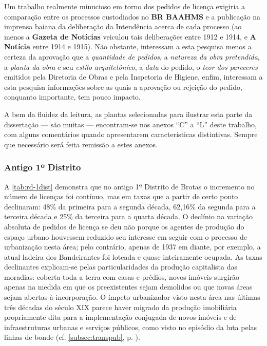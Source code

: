 Um trabalho realmente minucioso em torno dos pedidos de licença exigiria a comparação entre os processos custodiados no \textbf{BR BAAHMS} e a publicação na imprensa baiana da deliberação da Intendência acerca de cada processo (ao menos a \textbf{Gazeta de Notícias} veiculou tais deliberações entre 1912 e 1914, e \textbf{A Notícia} entre 1914 e 1915). Não obstante, interessam a esta pesquisa menos a certeza da aprovação que a \textit{quantidade de pedidos}, a \textit{natureza da obra pretendida}, a \textit{planta da obra} e seu \textit{estilo arquitetônico}, a \textit{data} do pedido, o \textit{teor dos pareceres} emitidos pela Diretoria de Obras e pela Inspetoria de Higiene, enfim, interessam a esta pesquisa informações sobre as quais a aprovação ou rejeição do pedido, conquanto importante, tem pouco impacto.

A bem da fluidez da leitura, as plantas selecionadas para ilustrar esta parte da dissertação --- são muitas --- encontram-se nos anexos ``C'' a ``L'' deste trabalho, com alguns comentários quando apresentarem características distintivas. Sempre que necessário será feita remissão a estes anexos.

\subsubsection{Antigo 1º Distrito}


A \autoref{tab:rd-1dist} demonstra que no antigo 1º Distrito de Brotas o incremento no número de licenças foi contínuo, mas em taxas que a partir de certo ponto declinaram: 48\% da primeira para a segunda década, 62,16\% da segunda para a terceira década e 25\% da terceira para a quarta década. O declínio na variação absoluta de pedidos de licença se deu não porque os agentes de produção do espaço urbano houvessem reduzido seu interesse em seguir com o processo de urbanização nesta área; pelo contrário, apenas de 1937 em diante, por exemplo, a atual ladeira dos Bandeirantes foi loteada e quase inteiramente ocupada. As taxas declinantes explicam-se pelas particularidades da produção capitalista das moradias: coberta toda a terra com casas e prédios, novos imóveis surgirão apenas na medida em que os preexistentes sejam demolidos ou que novas áreas sejam abertas à incorporação. O ímpeto urbanizador visto nesta área nas últimas três décadas do século XIX parece haver migrado da produção imobiliária propriamente dita para a implementação conjugada de novos imóveis e de infraestruturas urbanas e serviços públicos, como visto no episódio da luta pelas linhas de bonde (cf. \autoref{subsec:transpub}, p. \pageref{subsec:transpub}).

